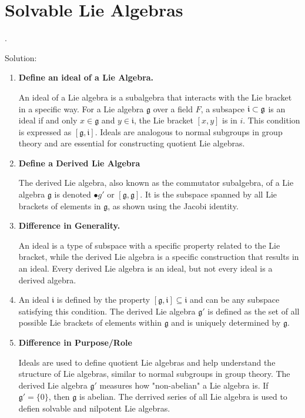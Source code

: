 \documentclass[12pt,a4paper]{report}
\begin{document}
\chapter{Solvable Lie Algebras}

\begin{remark}.

\noindent
Solution:
\begin{enumerate}[label=Step \arabic*:]
	\item \textbf{Define an ideal of a Lie Algebra.}
	
	An ideal of a Lie algebra is a subalgebra that interacts with the Lie bracket in a specific way.  For a Lie algebra $\mathfrak{g}$ over a field $F$, a subsapce $\mathfrak{i} \subset \frak{g}$ is an ideal if and only $x \in \mathfrak{g}$ and $y \in \mathfrak{i}$, the Lie bracket $[x,y]$ is in $i$.  This condition is expressed as $[\mathfrak{g}, \mathfrak{i}]$.  Ideals are analogous to normal subgroups in group theory and are essential for constructing quotient Lie algebras.
	
	\item \textbf{Define a Derived Lie Algebra}
	
	The derived Lie algebra, also known as the commutator subalgebra, of a Lie algebra $\mathfrak{g}$ is denoted $\mathfrak{•}{g}'$ or $[\mathfrak{g}, \mathfrak{g}]$.  It is the subspace spanned by all Lie brackets of elements in $\mathfrak{g}$, as shown using the Jacobi identity.
	
	\item \textbf{Difference in Generality.}
	
	An ideal is a type of subspace with a specific property related to the Lie bracket, while the derived Lie algebra is a specific construction that results in an ideal.  Every derived Lie algebra is an ideal, but not every ideal is a derived algebra.
	
	\item An ideal $\mathfrak{i}$ is defined by the property $[\mathfrak{g},\mathfrak{i}] \subseteq \mathfrak{i}$ and can be any subspace satisfying this condition.  The derived Lie algebra $\mathfrak{g}'$ is defined as the set of all possible Lie brackets of elements within $\mathfrak{g}$ and is uniquely determined by $\mathfrak{g}$.
	
	\item \textbf{Difference in Purpose/Role}
	
	Ideals are used to define quotient Lie algebras and help understand the structure of Lie algebras,  similar to normal subgroups in group theory.  The derived Lie algebra $\mathfrak{g}'$ measures how "non-abelian" a Lie algebra is.  If $\mathfrak{g}'=\{0\}$, then $\mathfrak{g}$ is abelian.  The derrived series of all Lie algebra is used to defien solvable and nilpotent Lie algebras.
	

\end{enumerate}
\end{remark}
\end{document}
